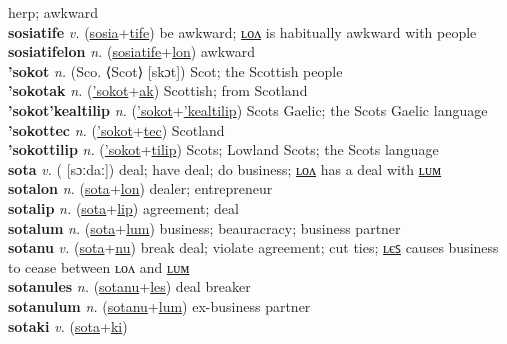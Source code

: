 herp; awkward \label{sosiatafulum} \\
\textbf{sosiatife} \textit{v.} (\hyperref[sosia]{sosia}+\hyperref[tife]{tife})
be awkward; \hyperref[sosiatifelon]{ʟᴏᴧ} is habitually awkward with people \label{sosiatife} \\
\textbf{sosiatifelon} \textit{n.} (\hyperref[sosiatife]{sosiatife}+\hyperref[lon]{lon})
awkward \label{sosiatifelon} \\
\textbf{'sokot} \textit{n.} (Sco. ⟨Scot⟩ [skɔt])
Scot; the Scottish people \label{'sokot} \\
\textbf{'sokotak} \textit{n.} (\hyperref['sokot]{'sokot}+\hyperref[ak]{ak})
Scottish; from Scotland \label{'sokotak} \\
\textbf{'sokot'kealtilip} \textit{n.} (\hyperref['sokot]{'sokot}+\hyperref['kealtilip]{'kealtilip})
Scots Gaelic; the Scots Gaelic language \label{'sokot'kealtilip} \\
\textbf{'sokottec} \textit{n.} (\hyperref['sokot]{'sokot}+\hyperref[tec]{tec})
Scotland \label{'sokottec} \\
\textbf{'sokottilip} \textit{n.} (\hyperref['sokot]{'sokot}+\hyperref[tilip]{tilip})
Scots; Lowland Scots; the Scots language \label{'sokottilip} \\
\textbf{sota} \textit{v.} ( [sɔːdaː])
deal; have deal; do business; \hyperref[sotalon]{ʟᴏᴧ} has a deal with \hyperref[sotalum]{ʟᴜᴍ} \label{sota} \\
\textbf{sotalon} \textit{n.} (\hyperref[sota]{sota}+\hyperref[lon]{lon})
dealer; entrepreneur \label{sotalon} \\
\textbf{sotalip} \textit{n.} (\hyperref[sota]{sota}+\hyperref[lip]{lip})
agreement; deal \label{sotalip} \\
\textbf{sotalum} \textit{n.} (\hyperref[sota]{sota}+\hyperref[lum]{lum})
business; beauracracy; business partner \label{sotalum} \\
\textbf{sotanu} \textit{v.} (\hyperref[sota]{sota}+\hyperref[nu]{nu})
break deal; violate agreement; cut ties; \hyperref[sotanules]{ʟєꜱ} causes business to cease between ʟᴏᴧ and \hyperref[sotanulum]{ʟᴜᴍ} \label{sotanu} \\
\textbf{sotanules} \textit{n.} (\hyperref[sotanu]{sotanu}+\hyperref[les]{les})
deal breaker \label{sotanules} \\
\textbf{sotanulum} \textit{n.} (\hyperref[sotanu]{sotanu}+\hyperref[lum]{lum})
ex-business partner \label{sotanulum} \\
\textbf{sotaki} \textit{v.} (\hyperref[sota]{sota}+\hyperref[ki]{ki})

